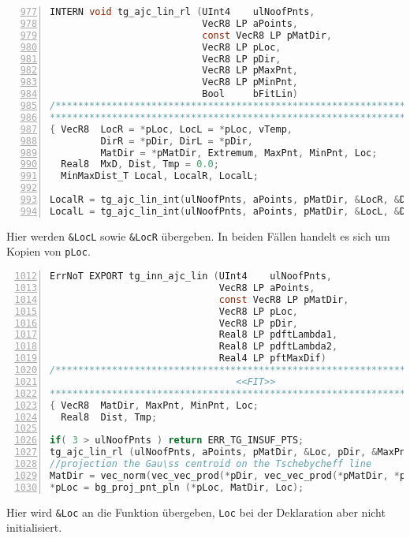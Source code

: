 \begin{lstlisting}[language=C, numbers=left, firstnumber=977]
INTERN void tg_ajc_lin_rl (UInt4    ulNoofPnts,
                           VecR8 LP aPoints,
                           const VecR8 LP pMatDir,
                           VecR8 LP pLoc,
                           VecR8 LP pDir,
                           VecR8 LP pMaxPnt,
                           VecR8 LP pMinPnt, 
                           Bool     bFitLin)
/*************************************************************************
*************************************************************************/
{ VecR8  LocR = *pLoc, LocL = *pLoc, vTemp,
         DirR = *pDir, DirL = *pDir, 
         MatDir = *pMatDir, Extremum, MaxPnt, MinPnt, Loc;
  Real8  MxD, Dist, Tmp = 0.0;
  MinMaxDist_T Local, LocalR, LocalL;

LocalR = tg_ajc_lin_int(ulNoofPnts, aPoints, pMatDir, &LocR, &DirR, True,  bFitLin);
LocalL = tg_ajc_lin_int(ulNoofPnts, aPoints, pMatDir, &LocL, &DirL, False, bFitLin);
\end{lstlisting}

Hier werden \verb|&LocL| sowie \verb|&LocR| übergeben. In beiden Fällen handelt es sich um Kopien von \verb|pLoc|.

\begin{lstlisting}[language=C, numbers=left, firstnumber=1012]
ErrNoT EXPORT tg_inn_ajc_lin (UInt4    ulNoofPnts,
                              VecR8 LP aPoints,
                              const VecR8 LP pMatDir,
                              VecR8 LP pLoc,
                              VecR8 LP pDir,
                              Real8 LP pdftLambda1,
                              Real8 LP pdftLambda2,
                              Real4 LP pftMaxDif)
/*************************************************************************
                                 <<FIT>>
*************************************************************************/
{ VecR8  MatDir, MaxPnt, MinPnt, Loc;
  Real8  Dist, Tmp;

if( 3 > ulNoofPnts ) return ERR_TG_INSUF_PTS;
tg_ajc_lin_rl (ulNoofPnts, aPoints, pMatDir, &Loc, pDir, &MaxPnt, &MinPnt, True);
//projection the Gau\ss centroid on the Tschebycheff line
MatDir = vec_norm(vec_vec_prod(*pDir, vec_vec_prod(*pMatDir, *pDir)), &Tmp);
*pLoc = bg_proj_pnt_pln (*pLoc, MatDir, Loc);
\end{lstlisting}

Hier wird \verb|&Loc| an die Funktion übergeben, \verb|Loc| bei der Deklaration aber nicht initialisiert.